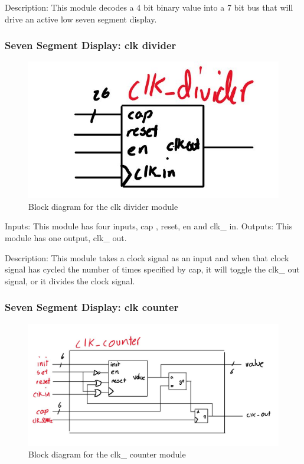 \documentclass[a4paper]{article}
\begin{document}
Description: This module decodes a 4 bit binary value into a 7 bit bus that will drive an active low seven segment display.

\subsubsection{Seven Segment Display: clk divider}
\begin{figure}[H]
    \includegraphics[width=0.8 \linewidth]{images/clkdivider.JPG}
    \caption{Block diagram for the clk divider module}
    \label{clkdriver}
\end{figure}

Inputs: This module has four inputs, cap , reset, en and clk\_ in.
Outputs: This module has one output, clk\_ out.

Description: This module takes a clock signal as an input and when that clock signal has cycled the number of times specified by cap, it will toggle the clk\_ out signal, or it divides the clock signal.

\subsubsection{Seven Segment Display: clk counter}
\begin{figure}[H]
    \includegraphics[width=0.8 \linewidth]{images/clkcounter.JPG}
    \caption{Block diagram for the clk\_ counter module}
    \label{clkcounter}
\end{figure}
\end{document}
